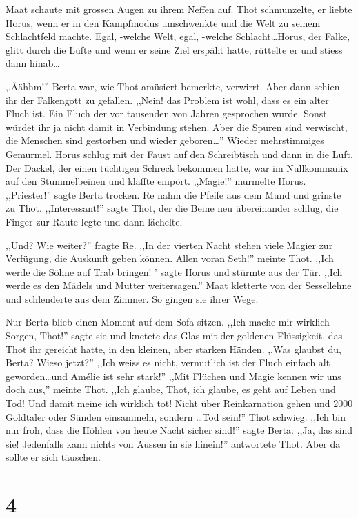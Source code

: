 \documentclass[11pt,titlepage,a5paper]{book}
\begin{document}
 Maat schaute mit grossen Augen zu ihrem Neffen auf. Thot schmunzelte, er liebte Horus, wenn er in den Kampfmodus umschwenkte und die Welt zu seinem Schlachtfeld machte. Egal, -welche Welt, egal, -welche Schlacht\dots Horus, der Falke, glitt durch die Lüfte und wenn er seine Ziel erspäht hatte, rüttelte er und stiess dann hinab\dots
 
,,Äähhm!'' Berta war, wie Thot amüsiert bemerkte, verwirrt. Aber dann schien ihr der Falkengott zu gefallen. ,,Nein! das Problem ist wohl, dass es ein alter Fluch ist. Ein Fluch der vor tausenden von Jahren gesprochen wurde. Sonst würdet ihr ja nicht damit in Verbindung stehen. Aber die Spuren sind verwischt, die Menschen sind gestorben und wieder geboren\dots '' Wieder mehrstimmiges Gemurmel. Horus schlug mit der Faust auf den Schreibtisch und dann in die Luft. Der Dackel, der einen tüchtigen Schreck bekommen hatte,  war im Nullkommanix auf den Stummelbeinen und kläffte empört. ,,Magie!'' murmelte Horus. ,,Priester!'' sagte Berta trocken. Re nahm die Pfeife aus dem Mund und grinste zu Thot. ,,Interessant!'' sagte Thot, der die Beine neu übereinander schlug, die Finger zur Raute legte und dann lächelte. 

,,Und? Wie weiter?'' fragte Re. ,,In der vierten Nacht stehen viele Magier zur Verfügung, die Auskunft geben können. Allen voran Seth!'' meinte Thot. ,,Ich werde die Söhne auf Trab bringen! ' sagte Horus und stürmte aus der Tür. ,,Ich werde es den Mädels und Mutter weitersagen.'' Maat kletterte von der Sessellehne und schlenderte aus dem Zimmer. So gingen sie ihrer Wege. 

Nur Berta blieb einen Moment auf dem Sofa sitzen. ,,Ich mache mir wirklich Sorgen, Thot!'' sagte sie und knetete das Glas mit der goldenen Flüssigkeit, das Thot ihr gereicht hatte, in den kleinen, aber starken Händen. ,,Was glaubst du, Berta? Wieso jetzt?'' ,,Ich weiss es nicht, vermutlich ist der Fluch einfach alt geworden\dots und Amélie ist sehr stark!'' ,,Mit Flüchen und Magie kennen wir uns doch aus,'' meinte Thot. ,,Ich glaube, Thot, ich glaube, es geht auf Leben und Tod! Und damit meine ich wirklich tot! Nicht über Reinkarnation gehen und 2000 Goldtaler oder Sünden einsammeln, sondern \dots Tod sein!'' Thot schwieg. ,,Ich bin nur froh, dass die Höhlen von heute Nacht sicher sind!'' sagte Berta. ,,Ja, das sind sie! Jedenfalls kann nichts von Aussen in sie hinein!'' antwortete Thot. Aber da sollte er sich täuschen. 

\section*{4}
\end{document}
